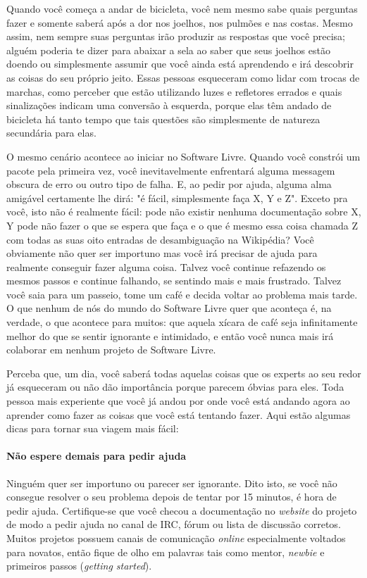 Quando você começa a andar de bicicleta, você nem mesmo sabe quais perguntas fazer
e somente saberá após a dor nos joelhos, nos pulmões e nas costas. Mesmo assim,
nem sempre suas perguntas irão produzir as respostas que você precisa; alguém poderia
te dizer para abaixar a sela ao saber que seus joelhos estão doendo ou simplesmente
assumir que você ainda está aprendendo e irá descobrir as coisas do seu próprio jeito.
Essas pessoas esqueceram como lidar com trocas de marchas, como perceber que estão
utilizando luzes e refletores errados e quais sinalizações indicam uma conversão à
esquerda, porque elas têm andado de bicicleta há tanto tempo que tais questões são
simplesmente de natureza secundária para elas.

O mesmo cenário acontece ao iniciar no Software Livre. Quando você constrói
um pacote pela primeira vez, você inevitavelmente enfrentará alguma messagem obscura de
erro ou outro tipo de falha. E, ao pedir por ajuda, alguma alma amigável certamente lhe
dirá: "é fácil, simplesmente faça X, Y e Z". Exceto pra você, isto não é realmente fácil:
pode não existir nenhuma documentação sobre X, Y pode não fazer o que se espera que faça
e o que é mesmo essa coisa chamada Z com todas as suas oito entradas de desambiguação
na Wikipédia? Você obviamente não quer ser importuno mas você irá precisar de ajuda
para realmente conseguir fazer alguma coisa. Talvez você continue refazendo os mesmos
passos e continue falhando, se sentindo mais e mais frustrado. Talvez você saia para um
passeio, tome um café e decida voltar ao problema mais tarde. O que nenhum de nós do
mundo do Software Livre quer que aconteça é, na verdade, o que acontece para muitos:
que aquela xícara de café seja infinitamente melhor do que se sentir ignorante e intimidado,
e então você nunca mais irá colaborar em nenhum projeto de Software Livre.

Perceba que, um dia, você saberá todas aquelas coisas que os experts ao seu redor
já esqueceram ou não dão importância porque parecem óbvias para eles. Toda pessoa
mais experiente que você já andou por onde você está andando agora
ao aprender como fazer as coisas que você está tentando fazer. Aqui estão algumas
dicas para tornar sua viagem mais fácil:

\paragraph*{Não espere demais para pedir ajuda} Ninguém quer ser importuno ou
parecer ser ignorante. Dito isto, se você não consegue resolver o seu problema
depois de tentar por 15 minutos, é hora de pedir ajuda. Certifique-se que você
checou a documentação no \textit{website} do projeto de modo a pedir ajuda no
canal de IRC, fórum ou lista de discussão corretos. Muitos projetos possuem
canais de comunicação \textit{online} especialmente voltados para novatos, então
fique de olho em palavras tais como mentor, \textit{newbie} e primeiros passos (\textit{getting started}).

